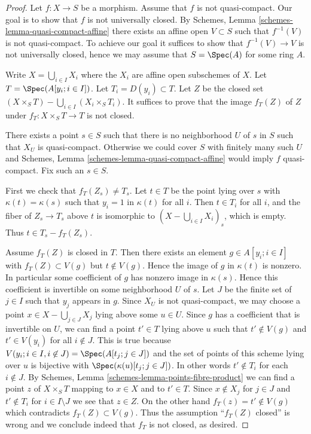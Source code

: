 \begin{proof}
Let $f : X \to S$ be a morphism. Assume that $f$ is not quasi-compact.
Our goal is to show that $f$ is not universally closed. By
Schemes, Lemma \ref{schemes-lemma-quasi-compact-affine}
there exists an affine open $V \subset S$ such that $f^{-1}(V)$ is
not quasi-compact. To achieve our goal it suffices to show that
$f^{-1}(V) \to V$ is not universally closed, hence we may assume that
$S = \Spec(A)$ for some ring $A$.

\medskip\noindent
Write $X = \bigcup_{i \in I} X_i$ where the $X_i$ are affine open subschemes
of $X$.  Let $T = \Spec(A[y_i ; i \in I])$.
Let $T_i = D(y_i) \subset T$. Let $Z$ be the closed set
$(X \times_S T) - \bigcup_{i \in I} (X_i \times_S T_i)$.  It suffices to
prove that the image $f_T(Z)$ of $Z$ under $f_T : X \times_S T \to T$
is not closed.

\medskip\noindent
There exists a point $s \in S$ such that there is no
neighborhood $U$ of $s$ in $S$ such that $X_U$ is quasi-compact.
Otherwise we could cover $S$ with finitely many such $U$ and
Schemes, Lemma \ref{schemes-lemma-quasi-compact-affine}
would imply $f$ quasi-compact. Fix such an $s \in S$.

\medskip\noindent
First we check that $f_T(Z_s) \ne T_s$.  Let $t \in T$ be the point
lying over $s$ with $\kappa(t) = \kappa(s)$ such that $y_i = 1$ in
$\kappa(t)$ for all $i$.
Then $t \in T_i$ for all $i$, and the fiber of $Z_s \to T_s$ above
$t$ is isomorphic to $(X - \bigcup_{i \in I} X_i)_s$, which is empty.
Thus $t \in T_s - f_T(Z_s)$.

\medskip\noindent
Assume $f_T(Z)$ is closed in $T$. Then there exists an element
$g \in A[y_i; i \in I]$ with $f_T(Z) \subset V(g)$ but $t \not \in V(g)$.
Hence the image of $g$ in $\kappa(t)$ is nonzero. In particular some
coefficient of $g$ has nonzero image in $\kappa(s)$. Hence this coefficient is
invertible on some neighborhood $U$ of $s$. Let $J$ be the finite set of
$j \in I$ such that $y_j$ appears in $g$. Since $X_U$ is not quasi-compact,
we may choose a point $x \in X - \bigcup_{j \in J} X_j$ lying above some
$u \in U$. Since $g$ has a coefficient that is invertible on $U$, we can
find a point $t' \in T$ lying above $u$ such that $t' \not \in V(g)$ and
$t' \in V(y_i)$ for all $i \notin J$. This is true because
$V(y_i; i \in I, i \not\in J) = \Spec(A[t_j; j\in J])$
and the set of points of this scheme lying over $u$ is bijective
with $\Spec(\kappa(u)[t_j; j \in J])$. In other words $t' \notin T_i$
for each $i \notin J$. By
Schemes, Lemma \ref{schemes-lemma-points-fibre-product}
we can find a point $z$ of $X \times_S T$ mapping to $x \in X$ and to
$t' \in T$. Since $x \not \in X_j$ for $j \in J$ and $t' \not \in T_i$
for $i \in I \setminus J$ we see that $z \in Z$. On the other hand
$f_T(z) = t' \not \in V(g)$ which contradicts $f_T(Z) \subset V(g)$.
Thus the assumption ``$f_T(Z)$ closed'' is wrong and we conclude indeed
that $f_T$ is not closed, as desired.
\end{proof}

